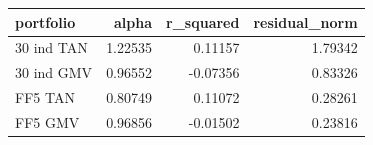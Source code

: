 \begin{tabular}{lrrr}
\toprule
portfolio & alpha & r\_squared & residual\_norm \\
\midrule
30 ind TAN & 1.22535 & 0.11157 & 1.79342 \\
30 ind GMV & 0.96552 & -0.07356 & 0.83326 \\
FF5 TAN & 0.80749 & 0.11072 & 0.28261 \\
FF5 GMV & 0.96856 & -0.01502 & 0.23816 \\
\bottomrule
\end{tabular}
